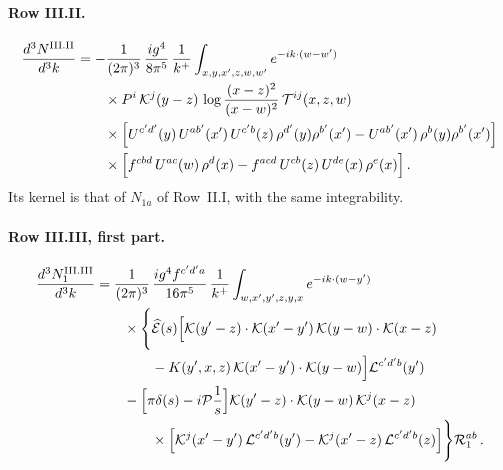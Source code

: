 \paragraph{Row III.II.}
\begin{align}\label{eq:app_IIIII}
\frac{d^3N^{\rm III.II}}{d^3k}&=-\frac{1}{(2\pi)^3}\,\frac{ig^4}{8\pi^5}\,\frac{1}{k^+}\int_{x,y,x',z,w,w'}e^{-ik\cdot(w-w')}\notag\\&\qquad\times P^i\,\mathcal{K}^j(y-z)\,\log\frac{(x-z)^2}{(x-w)^2}\,\mathcal T^{ij}(x,z,w)\notag\\
&\qquad\times\Big[U^{c'd'}(y)\,U^{ab'}(x')\,U^{c'b}(z)\,\rho^{d'}(y)\rho^{b'}(x')-U^{ab'}(x')\,\rho^b(y)\rho^{b'}(x')\Big]\notag\\
&\qquad\times\Big[f^{cbd}\,U^{ac}(w)\,\rho^d(x)-f^{acd}\,U^{cb}(z)\,U^{de}(x)\,\rho^e(x)\Big]\,.
\end{align}
Its kernel is that of $N_{1a}$ of Row~II.I, with the same integrability.

\paragraph{Row III.III, first part.}
\begin{align}\label{eq:app_III31}
\frac{d^3N^{\rm III.III}_1}{d^3k}&=\frac{1}{(2\pi)^3}\,\frac{ig^4f^{c'd'a}}{16\pi^5}\,\frac{1}{k^+}\int_{w,x',y',z,y,x}e^{-ik\cdot(w-y')}\notag\\
&\qquad\times\Bigg\{\widehat{\mathcal E}(s)\Big[\mathcal{K}(y'-z)\cdot\mathcal{K}(x'-y')\,\mathcal{K}(y-w)\cdot\mathcal{K}(x-z)\notag\\&\qquad\qquad-K(y',x,z)\,\mathcal{K}(x'-y')\cdot\mathcal{K}(y-w)\Big]\mathcal L^{c'd'b}(y')\notag\\
&\qquad-\Big[\pi\delta(s)-i\mathcal P\frac1s\Big]\mathcal{K}(y'-z)\cdot\mathcal{K}(y-w)\,\mathcal{K}^j(x-z)\notag\\
&\qquad\qquad\times\Big[\mathcal{K}^j(x'-y')\,\mathcal L^{c'd'b}(y')-\mathcal{K}^j(x'-z)\,\mathcal L^{c'd'b}(z)\Big]\Bigg\}\mathcal R_1^{ab}\,.
\end{align}

